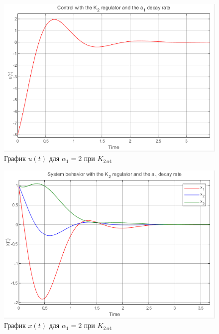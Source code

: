 \documentclass[a4paper, 12pt]{article}
\begin{document}
    \vspace*{0.01mm}
    \begin{figure}[H]
        \centering
        \includegraphics{1task_K2a1_u.png}
        \captionsetup{skip=0pt}
        \caption{График $u(t)$ для $\alpha_1=2$ при $K_{2\,\alpha1}$}
        \label{fig:1task_K2a1_u}
    \end{figure}
    \begin{figure}[H]
        \centering
        \includegraphics{1task_K2a1_x.png}
        \captionsetup{skip=0pt}
        \caption{График $x(t)$ для $\alpha_1=2$ при $K_{2\,\alpha1}$}
        \label{fig:1task_K2a1_x}
    \end{figure}
    \vspace*{0.01mm}
\end{document}
